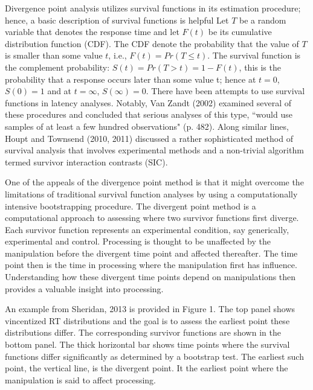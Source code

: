 \documentclass[man]{apa}%
\begin{document}
      Divergence point analysis utilizes survival functions in its estimation procedure; hence, a basic description of survival functions is helpful  Let $T$ be a random variable that denotes the response time and let $F(t)$ be its cumulative distribution function (CDF). The CDF denote the probability that the value of $T$ is smaller than some value $t$, i.e., $F(t)=Pr(T \leq t)$.  The survival function is the complement probability: $S(t)=Pr(T>t)=1-F(t)$, this is the probability that a response occurs later than some value t; hence at $t=0$, $S(0) = 1$ and at $t=\infty$, $S( \infty ) = 0$. There have been attempts to use survival functions in latency analyses.  Notably, Van Zandt (2002) examined several of these procedures and concluded that serious analyses of this type, ``would use samples of at least a few hundred observations" (p. 482). Along similar lines, Houpt and Townsend (2010, 2011) discussed a rather sophisticated method of survival analysis that involves experimental methods and a non-trivial algorithm termed survivor interaction contrasts (SIC).

       One of the appeals of the divergence point method is that it might overcome the limitations of traditional survival function analyses by using a computationally intensive bootstrapping procedure.  The divergent point method is a computational approach to assessing where two survivor functions first diverge.  Each survivor function represents an experimental condition, say generically, experimental and control.  Processing is thought to be unaffected by the manipulation before the divergent time point and affected thereafter.  The time point then is the time in processing where the manipulation first has influence.  Understanding how these divergent time points depend on manipulations then provides a valuable insight into processing.

An example from Sheridan, 2013 is provided in Figure 1.  The top panel shows vincentized RT distributions and the goal is to assess the earliest point these distributions differ.  The corresponding survivor functions are shown in the bottom panel.  The thick horizontal bar shows time points where the survival functions differ significantly as determined by a bootstrap test.  The earliest such point, the vertical line, is the divergent point.  It the earliest point where the manipulation is said to affect processing.

       
       
\end{document}
